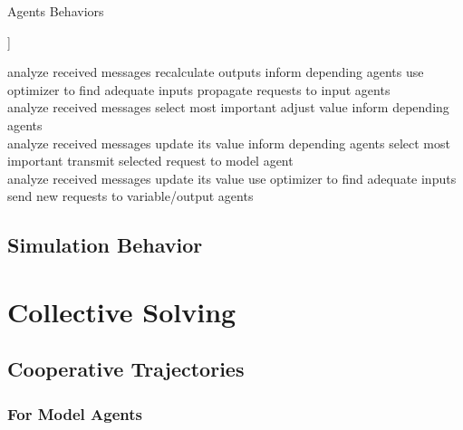 \begin{algorithm}
\caption{Agents Behaviors}
\label{agent_algo}
\begin{algorithmic}[[TODO: correct algo formatting]]

\Loop
	\State analyze received messages
        \State recalculate outputs
        \State inform depending agents
    \EndIf      
       \State  use optimizer to find adequate inputs
        \State propagate requests to input agents
    \EndIf
\EndLoop
\EndProcedure
\\
\Loop
	\State analyze received messages
       \State select most important
       \State adjust value
       \State inform depending agents
    \EndIf
\EndLoop
\EndProcedure
\\
\Loop
	\State analyze received messages
        \State update its value
        \State inform depending agents
    \EndIf      
       \State  select most important
        \State transmit selected request to model agent
    \EndIf
\EndLoop
\EndProcedure
\\
\Loop
	\State analyze received messages
        \State update its value
        \State use optimizer to find adequate inputs
        \State send new requests to variable/output agents
    \EndIf      
\EndLoop
\EndProcedure
\end{algorithmic}
\end{algorithm}




\section{Simulation Behavior}

\chapter{Collective Solving}

\section{Cooperative Trajectories}

\subsection{For Model Agents}

